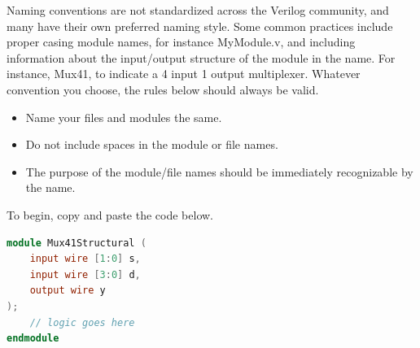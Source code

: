 \documentclass[12pt]{journal}
\begin{document}
\begin{extra}[frametitle={Naming Conventions}]
    Naming conventions are not standardized across the Verilog community, and many have their own preferred naming style. Some common practices include proper casing module names, for instance MyModule.v, and including information about the input/output structure of the module in the name. For instance, Mux41, to indicate a 4 input 1 output multiplexer. Whatever convention you choose, the rules below should always be valid.
\begin{itemize}
    \item Name your files and modules the same.
    \item Do not include spaces in the module or file names.
    \item The purpose of the module/file names should be immediately recognizable by the name.
\end{itemize}
\end{extra}

To begin, copy and paste the code below.

\begin{lstlisting}[language=Verilog]
module Mux41Structural (
    input wire [1:0] s, 
    input wire [3:0] d,
    output wire y
);
    // logic goes here
endmodule
\end{lstlisting}
\end{document}
